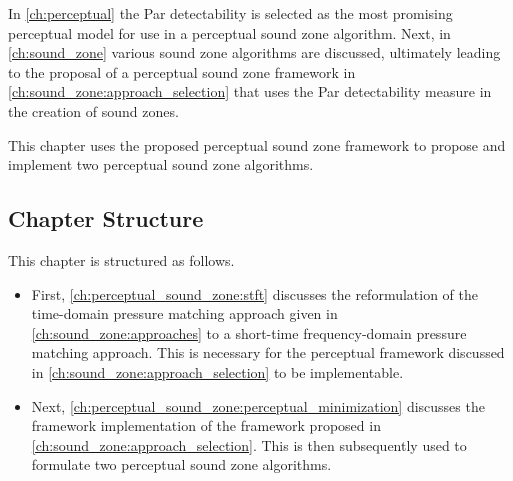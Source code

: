 In \autoref{ch:perceptual} the Par detectability is selected as the most promising perceptual model for use in a perceptual sound zone algorithm.
Next, in \autoref{ch:sound_zone} various sound zone algorithms are discussed, ultimately leading to the proposal of a perceptual sound zone framework in \autoref{ch:sound_zone:approach_selection} that uses the Par detectability measure in the creation of sound zones.

This chapter uses the proposed perceptual sound zone framework to propose and implement two perceptual sound zone algorithms.

\subsection*{Chapter Structure}
This chapter is structured as follows.
\begin{itemize}
    \item First, \autoref{ch:perceptual_sound_zone:stft} discusses the reformulation of the time-domain pressure matching approach given in \autoref{ch:sound_zone:approaches} to a short-time frequency-domain pressure matching approach.
    This is necessary for the perceptual framework discussed in \autoref{ch:sound_zone:approach_selection} to be implementable.
    \item Next, \autoref{ch:perceptual_sound_zone:perceptual_minimization} discusses the framework implementation of the framework proposed in \autoref{ch:sound_zone:approach_selection}. This is then subsequently used to formulate two perceptual sound zone algorithms.
\end{itemize}
